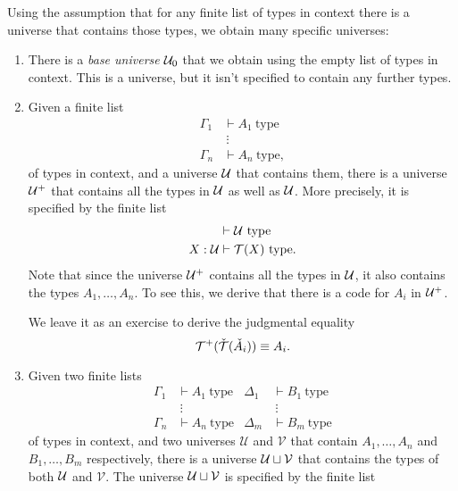 \begin{rmk}
  Using the assumption that for any finite list of types in context there is a universe that contains those types, we obtain many specific universes:
  \begin{enumerate}
  \item There is a \emph{base universe} $\UU_0$ that we obtain using the empty list of types in context. This is a universe, but it isn't specified to contain any further types.
  \item Given a finite list
    \begin{align*}
      \Gamma_1 & \vdash A_1~\mathrm{type} \\
      & ~\vdots \\
      \Gamma_n & \vdash A_n~\mathrm{type},
    \end{align*}
    of types in context, and a universe $\UU$ that contains them, there is a universe $\UU^+$ that contains all the types in $\UU$ as well as $\UU$. More precisely, it is specified by the finite list
    \begin{align*}
      & \vdash \UU~\mathrm{type} \\
      X:\UU & \vdash \mathcal{T}(X)~\mathrm{type}.
    \end{align*}
    Note that since the universe $\UU^+$ contains all the types in $\UU$, it also contains the types $A_1,\ldots,A_n$. To see this, we derive that there is a code for $A_i$ in $\UU^+$.
    \begin{prooftree}
    \end{prooftree}
    We leave it as an exercise to derive the judgmental equality
    \begin{equation*}
      \mathcal{T}^+(\check{\mathcal{T}}(\check{A}_i))\jdeq A_i.
    \end{equation*}
  \item Given two finite lists
    \begin{align*}
      \Gamma_1 & \vdash A_1~\mathrm{type} & \Delta_1 & \vdash B_1~\mathrm{type} \\
      & ~\vdots & & ~\vdots \\
      \Gamma_n & \vdash A_n~\mathrm{type} & \Delta_m & \vdash B_m~\mathrm{type}
    \end{align*}
    of types in context, and two universes $\mathcal{U}$ and $\mathcal{V}$ that contain $A_1,\ldots,A_n$ and $B_1,\ldots,B_m$ respectively, there is a universe $\UU\sqcup\mathcal{V}$ that contains the types of both $\UU$ and $\mathcal{V}$. The universe $\UU\sqcup\mathcal{V}$ is specified by the finite list

\end{enumerate}
\end{rmk}
